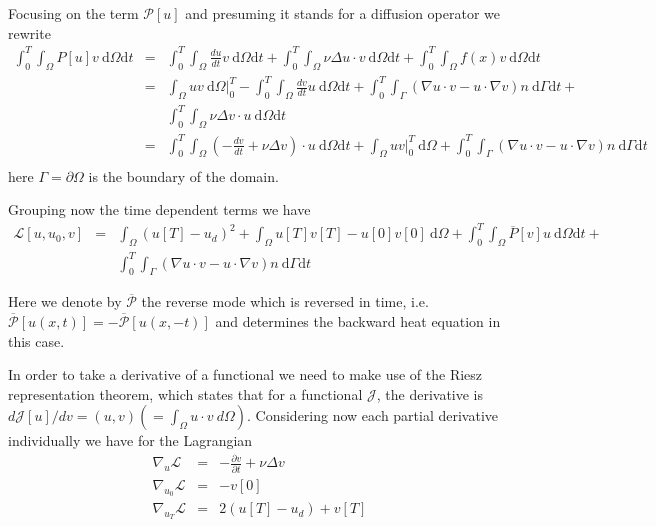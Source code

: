 \documentclass[10pt]{article}
\renewcommand{\d}{\mathrm{d}}
\begin{document}
{

Focusing on the term $\mathcal P[u]$ and presuming it stands for a diffusion operator we rewrite
\begin{eqnarray}
\int_0^T\int_{\Omega} P[u]  v \ \d \Omega \d t &=&
\int_0^T\int_{\Omega} \frac{d u}{d t}  v \ \d \Omega \d t+ \int_0^T\int_{\Omega} \nu\Delta  u \cdot  v \ \d \Omega \d t+\int_0^T\int_{\Omega}  f( x)   v \ \d \Omega \d t \\ \nonumber
&=& \int_{\Omega} u v \ \d \Omega|_0^T -
\int_0^T\int_{\Omega}
 \frac{d v}{d t}  u \ \d \Omega \d t+ \int_0^T\int_{\Gamma}(\nabla  u\cdot  v-  u\cdot \nabla v) n\ \d \Gamma \d t + \\ \nonumber
 && \int_0^T\int_{\Omega} \nu\Delta  v\cdot   u \ \d \Omega \d t \\ \nonumber
 &=& 
\int_0^T\int_{\Omega}
(- \frac{d v}{d t}  +\nu\Delta  v)\cdot   u\ \d \Omega \d t+\int_{\Omega} u v |_0^T \ \d \Omega
+ \int_0^T\int_{\Gamma}(\nabla  u\cdot  v-  u\cdot \nabla v) n\ \d \Gamma \d t \\ \nonumber
\end{eqnarray}
here $\Gamma=\partial \Omega$ is the boundary of the domain.

Grouping now the time dependent terms we have
\begin{eqnarray}
\mathcal{L}[ u, u_0,v]&=&\int_{\Omega}( u[T]- u_d)^2 + \int_{\Omega} u[T] v[T] - u[0] v[0]\ \d \Omega+\int_0^T\int_{\Omega} \overline{P}[ v]  u \ \d \Omega \d t + \\ \nonumber
 && \int_0^T\int_{\Gamma}(\nabla  u\cdot  v-  u\cdot \nabla v) n\ \d \Gamma \d t
\end{eqnarray}

Here we denote by $\overline{\mathcal P}$ the reverse mode which is reversed in time, i.e. $\overline{\mathcal P}[u(x,t)]=-\overline{\mathcal P}[u(x,-t)]$ and determines the backward heat equation in this case. 

In order to take a derivative of a functional we need to make use of the Riesz representation theorem, which states that for a functional $\mathcal J$, the derivative is $d \mathcal J[u]/dv=(u,v)(=\int_{\Omega} u\cdot v \ d \Omega)$. Considering now each partial derivative individually we have for the Lagrangian
\begin{eqnarray}
\nabla_u \mathcal L&=&- \frac{\partial v}{\partial t}  +\nu\Delta  v \\ \nonumber
\nabla_{u_0} \mathcal L&=&- v[0]\\ \nonumber
\nabla_{u_T} \mathcal L&=&2( u[T]- u_d)+ v[T]\\ \nonumber
\label{eq:bcs_ics}
\end{eqnarray}

}
\end{document}
